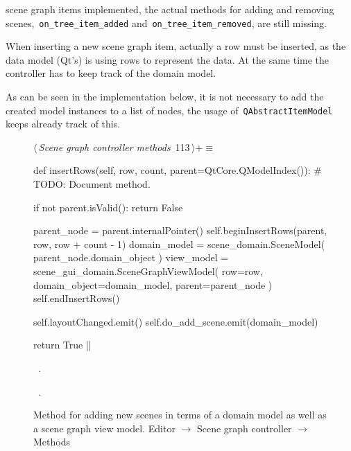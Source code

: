 \documentclass[%
    a4paper,    %
    justified,  %
    nobib,      %
    openany     %
]{tufte-book}
\makeatletter
\renewcommand{\label}[1]{\@tufte@label{##1}}%
\makeatother
\begin{document}
 scene
graph items implemented, the actual methods for adding and removing
scenes,~\verb=on_tree_item_added= and~\verb=on_tree_item_removed=, are still
missing.

When inserting a new scene graph item, actually a row must be inserted, as the
data model (Qt's) is using rows to represent the data. At the same time the
controller has to keep track of the domain model.

As can be seen in the implementation below, it is not necessary to add the
created model instances to a list of nodes, the usage
of~\verb=QAbstractItemModel= keeps already track of this.

\begin{figure}[!htbp]
\begin{flushleft} \small
\begin{minipage}{\linewidth}\label{scrap50}\raggedright\small
{} $\langle\,${\itshape Scene graph controller methods}\nobreak\ {\footnotesize {113}}$\,\rangle+\equiv$
\vspace{-1ex}
\begin{pythoncode}
def insertRows(self, row, count, parent=QtCore.QModelIndex()):
    # TODO: Document method.

    if not parent.isValid():
        return False

    parent_node = parent.internalPointer()
    self.beginInsertRows(parent, row, row + count - 1)
    domain_model  = scene_domain.SceneModel(
        parent_node.domain_object
    )
    view_model = scene_gui_domain.SceneGraphViewModel(
        row=row,
        domain_object=domain_model,
        parent=parent_node
    )
    self.endInsertRows()

    self.layoutChanged.emit()
    self.do_add_scene.emit(domain_model)

    return True
|\NWsep|
\end{pythoncode}
\vspace{1.5ex}
\footnotesize
\begin{list}{}{\setlength{\itemsep}{-\parsep}\setlength{\itemindent}{-\leftmargin}}
\item \NWtxtMacroDefBy\ .
\item \NWtxtMacroRefIn\ .

\item{}
\end{list}
\end{minipage}\vspace{4ex}
\end{flushleft}
\caption{Method for adding new scenes in terms of a domain model as well as a
  scene graph view model.
  \newline{}\newline{}Editor $\rightarrow$ Scene graph controller
  $\rightarrow$ Methods}
\end{figure}
\end{document}
